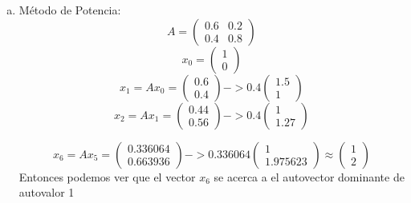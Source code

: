\begin{frame}
    
\begin{solution}
     \begin{enumerate}[d)]
			\item
            Método de Potencia:
            \begin{equation*}
            A=\begin{pmatrix}0.6 & 0.2\\0.4 & 0.8 \end{pmatrix}   
         \end{equation*}
        \begin{equation*}
           x_{0}= \begin{pmatrix}1\\0 \end{pmatrix}
         \end{equation*}
         \begin{equation*}
           x_{1}=Ax_{0}= \begin{pmatrix}0.6\\0.4 \end{pmatrix}->0.4\begin{pmatrix}1.5\\1 \end{pmatrix}
         \end{equation*}
         \begin{equation*}
           x_{2}=Ax_{1}= \begin{pmatrix}0.44\\0.56 \end{pmatrix}->0.4\begin{pmatrix}1\\1.27 \end{pmatrix}
         \end{equation*}
         
         \begin{equation*}
           x_{6}=Ax_{5}= \begin{pmatrix}0.336064\\0.663936 \end{pmatrix}->0.336064\begin{pmatrix}1\\1.975623 \end{pmatrix} \approx \begin{pmatrix}1\\2 \end{pmatrix}
         \end{equation*}
		Entonces podemos ver que el vector $x_{6}$ se acerca a el autovector dominante de autovalor 1 
		\end{enumerate}
\end{solution}

\end{frame}
